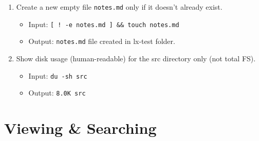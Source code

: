 \begin{enumerate}
\item Create a new empty file \texttt{notes.md} only if it doesn't already exist.
\begin{itemize}
\item Input: \texttt{[ ! -e notes.md ] \&\& touch notes.md}
\item Output: \texttt{notes.md} file created in lx-test folder.
\end{itemize}

\item Show disk usage (human-readable) for the src directory only (not total FS).
\begin{itemize}
\item Input: \texttt{du -sh src}
\item Output: \texttt{8.0K src}
\end{itemize}
\end{enumerate}

\section{Viewing \& Searching}

